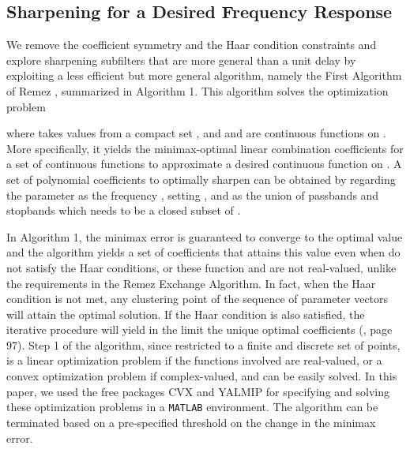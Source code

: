 \documentclass[journal] {IEEEtran}
\begin{document}
\subsection{Sharpening for a Desired Frequency Response}
We remove the coefficient symmetry and the Haar condition constraints and explore sharpening subfilters  that are more general than a unit delay by exploiting a less efficient but more general algorithm, namely the First Algorithm of Remez \cite{Cheney1966}, summarized in Algorithm 1. This algorithm solves the optimization problem

where  takes values from a compact set , and  and  are continuous functions on . More specifically, it yields the minimax-optimal linear combination coefficients  for a set of continuous functions  to approximate a desired continuous function  on . A set of polynomial coefficients  to optimally sharpen  can be obtained by regarding the parameter  as the frequency , setting ,  and  as the union of passbands and stopbands which needs to be a closed subset of .




In Algorithm 1, the minimax error is guaranteed to converge to the optimal value and the algorithm yields a set of coefficients  that attains this value even when  do not satisfy the Haar conditions, or these function and  are not real-valued, unlike the requirements in the Remez Exchange Algorithm. In fact, when the Haar condition is not met, any clustering point of the sequence of parameter vectors  will attain the optimal solution. If the Haar condition is also satisfied, the iterative procedure will yield in the limit the unique optimal coefficients  (\cite{Cheney1966}, page 97). Step 1 of the algorithm, since restricted to a finite and discrete set of points, is a linear optimization problem if the functions involved are real-valued, or a convex optimization problem if complex-valued, and can be easily solved. In this paper, we used the free packages CVX \cite{cvx,Grant2008} and YALMIP \cite{yalmip} for specifying and solving these optimization problems in a \texttt{MATLAB} environment. The algorithm can be terminated based on a pre-specified threshold on the change in the minimax error.
\end{document}
